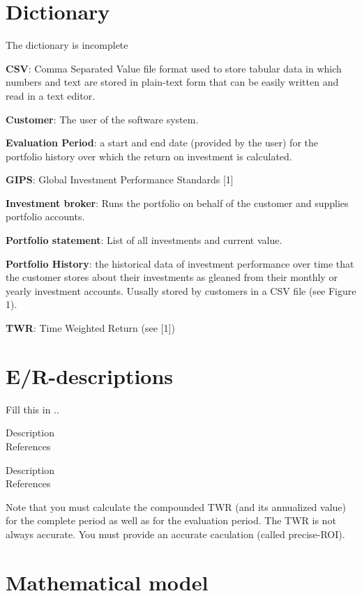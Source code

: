 \documentclass[runningheads,12pt]{article}
\begin{document}
\section{Dictionary}

The dictionary is incomplete

\smallskip

\noindent\textbf{CSV}: Comma Separated Value file format used to store tabular data in which numbers and text are stored in plain-text form that can be easily written and read in a text editor.\smallskip

\noindent\textbf{Customer}: The user of the software system.\smallskip

\noindent\textbf{Evaluation Period}: a start and end date (provided by the user) for the portfolio history over which the return on investment is calculated.\smallskip

\noindent\textbf{GIPS}: Global Investment Performance Standards [1]\smallskip

\noindent\textbf{Investment broker}: Runs the portfolio on behalf of the customer and supplies portfolio accounts.\smallskip

\noindent\textbf{Portfolio statement}: List of all investments and current value.\smallskip

\noindent\textbf{Portfolio History}: the historical data of investment performance over time that the customer stores about their investments as gleaned from their monthly or yearly investment accounts. Uusally stored by customers in a CSV file (see Figure 1).\smallskip

\noindent\textbf{TWR}: Time Weighted Return (see [1])\smallskip

\section{E/R-descriptions}
Fill this in ..

{Description\\}
{References}

{Description\\}
{References}

{\color{red} Note that you must calculate the compounded TWR (and its annualized value) for the complete period as well as for the evaluation period. The TWR is not always accurate. You must provide an accurate caculation (called precise-ROI).}

\section{Mathematical model}
\end{document}
